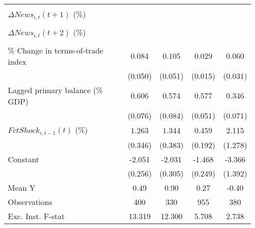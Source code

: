 {\begin{tabular}{l*{4}{c}}
                    &                     &                     &                     &                     \\
\addlinespace
$ \Delta News_{i,t}(t+1)$ (\%)&                     &                     &                     &                     \\
                    &                     &                     &                     &                     \\
\addlinespace
$ \Delta News_{i,t}(t+2)$ (\%)&                     &                     &                     &                     \\
                    &                     &                     &                     &                     \\
\addlinespace
\% Change in terms-of-trade index&       0.084         &       0.105\sym{*}  &       0.029\sym{*}  &       0.060\sym{*}  \\
                    &     (0.050)         &     (0.051)         &     (0.015)         &     (0.031)         \\
\addlinespace
Lagged primary balance (\% GDP)&       0.606\sym{***}&       0.574\sym{***}&       0.577\sym{***}&       0.346\sym{***}\\
                    &     (0.076)         &     (0.084)         &     (0.051)         &     (0.071)         \\
\addlinespace
$ FctShock_{i,t-1}(t)$ (\%)&       1.263\sym{***}&       1.344\sym{***}&       0.459\sym{**} &       2.115         \\
                    &     (0.346)         &     (0.383)         &     (0.192)         &     (1.278)         \\
\addlinespace
Constant            &      -2.051\sym{***}&      -2.031\sym{***}&      -1.468\sym{***}&      -3.366\sym{**} \\
                    &     (0.256)         &     (0.305)         &     (0.249)         &     (1.392)         \\
\midrule
Mean Y              &        0.49         &        0.90         &        0.27         &       -0.40         \\
Observations        &         400         &         330         &         955         &         380         \\
Exc. Inst. F-stat   &      13.319         &      12.300         &       5.708         &       2.738         \\
\bottomrule
\end{tabular}
}
